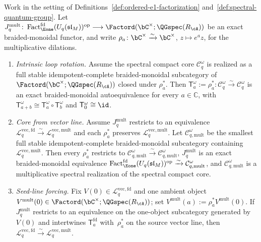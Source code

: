 \begin{proposition}
\label{prop:yangian-dk5-spectral-factorization-shifts}%
\label{prop:yangian-dk5-spectral-factorization-core-from-vector-line}%
\label{prop:yangian-dk5-spectral-factorization-seed-line}%
Work in the setting of
Definitions~\ref{def:ordered-e1-factorization}
and~\ref{def:spectral-quantum-group}.  Let
\(J_q^{\mathrm{mult}}\colon
\operatorname{Fact}_{\Eone}^{\mathrm{fd}}(U_q(\mathfrak{sl}_M))^{\mathrm{op}}
\longrightarrow
\Factord(\bC^\times;\QGspec(R_{\cA}))\)
be an exact braided-monoidal functor, and write
\(\rho_a\colon \bC^\times\xrightarrow{\sim}\bC^\times\),
\(z\mapsto e^a z\), for the multiplicative dilations.
\begin{enumerate}[label=\textup{(\alph*)}]
\item\emph{Intrinsic loop rotation.}
  Assume the spectral compact core \(\mathcal{C}_q^\omega\) is
  realized as a full stable idempotent-complete braided-monoidal
  subcategory of
  \(\Factord(\bC^\times;\QGspec(R_{\cA}))\) closed under
  \(\rho_a^*\).  Then
  \(\mathsf T_a^\omega:=\rho_a^*\colon
  \mathcal C_q^\omega\xrightarrow{\sim}\mathcal C_q^\omega\)
  is an exact braided-monoidal autoequivalence for every
  \(a\in\mathbb C\), with
  \(\mathsf T_{a+b}^\omega\cong
  \mathsf T_a^\omega\circ \mathsf T_b^\omega\) and
  \(\mathsf T_0^\omega\cong \id\).

\item\emph{Core from vector line.}
  Assume \(J_q^{\mathrm{mult}}\) restricts to an equivalence
  \(\mathcal L_q^{\mathrm{vec,fd}}
  \xrightarrow{\sim}
  \mathcal L_q^{\mathrm{vec,mult}}\)
  and each \(\rho_a^*\) preserves
  \(\mathcal L_q^{\mathrm{vec,mult}}\).  Let
  \(\mathcal C_{q,\mathrm{mult}}^\omega\) be the smallest full stable
  idempotent-complete braided-monoidal subcategory containing
  \(\mathcal L_q^{\mathrm{vec,mult}}\).  Then every \(\rho_a^*\)
  restricts to
  \(\mathcal C_{q,\mathrm{mult}}^\omega\xrightarrow{\sim}
  \mathcal C_{q,\mathrm{mult}}^\omega\),
  \(J_q^{\mathrm{mult}}\) is an exact braided-monoidal equivalence
  \(\operatorname{Fact}_{\Eone}^{\mathrm{fd}}(U_q(\mathfrak{sl}_M))^{\mathrm{op}}
  \xrightarrow{\sim}
  \mathcal C_{q,\mathrm{mult}}^\omega\),
  and \(\mathcal C_{q,\mathrm{mult}}^\omega\) is a multiplicative
  spectral realization of the spectral compact core.

\item\emph{Seed-line forcing.}
  Fix $V(0)\in \mathcal L_q^{\mathrm{vec,fd}}$ and one ambient
  object
  $V^{\mathrm{mult}}(0)\in
  \Factord(\bC^\times;\allowbreak\QGspec(R_{\cA}))$;
  set
  $V^{\mathrm{mult}}(a):=\rho_a^*V^{\mathrm{mult}}(0)$.
  If $J_q^{\mathrm{mult}}$ restricts to an equivalence on the
  one-object subcategory generated by~$V(0)$ and intertwines
  $\mathsf T_a^{\mathrm{fd}}$ with~$\rho_a^*$ on the source
  vector line, then
  $\mathcal L_q^{\mathrm{vec,fd}}
  \xrightarrow{\sim}
  \mathcal L_q^{\mathrm{vec,mult}}$.
\end{enumerate}
\end{proposition}


